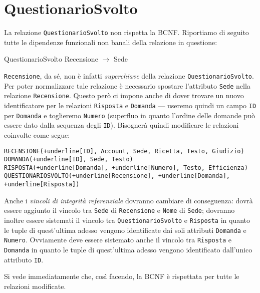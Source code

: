 \section{QuestionarioSvolto}\label{sec:questionariosvolto}
La relazione {\tt QuestionarioSvolto} non rispetta la BCNF. Riportiamo di seguito tutte
le dipendenze funzionali non banali della relazione in questione:
\begin{funcdep}{QuestionarioSvolto}
    Recensione $\to$ Sede
\end{funcdep}
\noindent\texttt{Recensione}, da sé, non è infatti {\it superchiave} della relazione {\tt QuestionarioSvolto}.
Per poter normalizzare tale relazione è necessario spostare l'attributo {\tt Sede} nella
relazione {\tt Recensione}. Questo però ci impone anche di dover trovare un nuovo identificatore
per le relazioni {\tt Risposta} e {\tt Domanda} --- useremo quindi un campo {\tt ID} per {\tt Domanda} e
toglieremo {\tt Numero} (superfluo in quanto l'ordine delle domande può essere dato dalla sequenza
degli {\tt ID}). Bisognerà quindi modificare le relazioni coinvolte come segue:

\begin{Verbatim}[commandchars=+\[\]]
RECENSIONE(+underline[ID], Account, Sede, Ricetta, Testo, Giudizio)
DOMANDA(+underline[ID], Sede, Testo)
RISPOSTA(+underline[Domanda], +underline[Numero], Testo, Efficienza)
QUESTIONARIOSVOLTO(+underline[Recensione], +underline[Domanda], +underline[Risposta])
\end{Verbatim}
Anche i {\it vincoli di integrità referenziale} dovranno cambiare di conseguenza: dovrà
essere aggiunto il vincolo tra {\tt Sede} di {\tt Recensione} e {\tt Nome} di {\tt Sede}; dovranno
inoltre essere sistemati il vincolo tra {\tt QuestionarioSvolto} e {\tt Risposta} in quanto le tuple di quest'ultima
adesso vengono identificate dai soli attributi {\tt Domanda} e {\tt Numero}. Ovviamente deve essere
sistemato anche il vincolo tra {\tt Risposta} e {\tt Domanda} in quanto le tuple di quest'ultima adesso
vengono identificato dall'unico attributo {\tt ID}.

\vspace{10pt}
\noindent Si vede immediatamente che, così facendo, la BCNF è rispettata per tutte le relazioni modificate.
